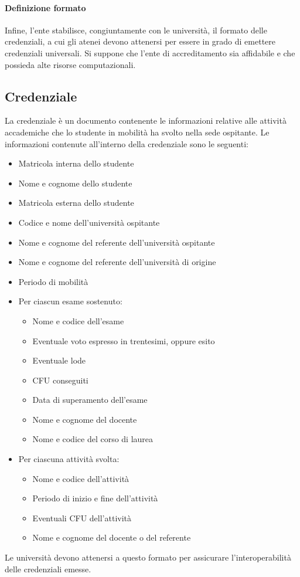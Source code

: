 \documentclass[a4paper,12pt]{article}
\begin{document}
\paragraph{Definizione formato} Infine, l'ente stabilisce, congiuntamente con le università, il formato delle credenziali, a cui gli atenei devono attenersi per essere in grado di emettere credenziali universali.
\newline Si suppone che l'ente di accreditamento sia affidabile e che possieda alte risorse computazionali.

\subsection{Credenziale}
La credenziale è un documento contenente le informazioni relative alle attività accademiche che lo studente in mobilità ha svolto nella sede ospitante. 
\newline Le informazioni contenute all'interno della credenziale sono le seguenti:
\begin{itemize}
    \item Matricola interna dello studente
    \item Nome e cognome dello studente
    \item Matricola esterna dello studente
    \item Codice e nome dell'università ospitante
    \item Nome e cognome del referente dell'università ospitante
    \item Nome e cognome del referente dell'università di origine
    \item Periodo di mobilità
    \item Per ciascun esame sostenuto:
    \begin{itemize}[label=$\circ$]
        \item Nome e codice dell'esame
        \item Eventuale voto espresso in trentesimi, oppure esito
        \item Eventuale lode
        \item CFU conseguiti
        \item Data di superamento dell'esame
        \item Nome e cognome del docente
        \item Nome e codice del corso di laurea
    \end{itemize}
    \item Per ciascuna attività svolta:
    \begin{itemize}[label=$\circ$]
        \item Nome e codice dell'attività
        \item Periodo di inizio e fine dell'attività
        \item Eventuali CFU dell'attività
        \item Nome e cognome del docente o del referente
    \end{itemize}
\end{itemize}
Le università devono attenersi a questo formato per assicurare l'interoperabilità delle credenziali emesse.
\end{document}

